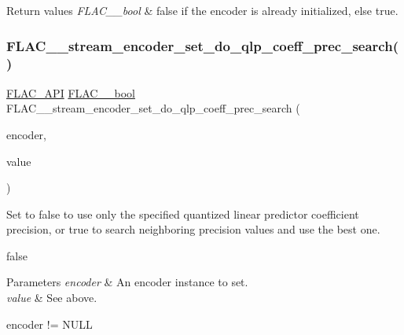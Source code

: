 \begin{DoxyRetVals}{Return values}
{\em F\+L\+A\+C\+\_\+\+\_\+bool} & {\ttfamily false} if the encoder is already initialized, else {\ttfamily true}. \\
\hline
\end{DoxyRetVals}
\mbox{\label{group__flac__stream__encoder_ga3aa94a1aec1cf40c37e54434c86bb50d}} 
\subsubsection{\texorpdfstring{F\+L\+A\+C\+\_\+\+\_\+stream\+\_\+encoder\+\_\+set\+\_\+do\+\_\+qlp\+\_\+coeff\+\_\+prec\+\_\+search()}{FLAC\_\_stream\_encoder\_set\_do\_qlp\_coeff\_prec\_search()}}
{\footnotesize\ttfamily \hyperlink{group__flac__export_ga56ca07df8a23310707732b1c0007d6f5}{F\+L\+A\+C\+\_\+\+A\+PI} \hyperlink{ordinals_8h_a95103469f1cbd78b8cf250194985b34e}{F\+L\+A\+C\+\_\+\+\_\+bool} F\+L\+A\+C\+\_\+\+\_\+stream\+\_\+encoder\+\_\+set\+\_\+do\+\_\+qlp\+\_\+coeff\+\_\+prec\+\_\+search (\begin{DoxyParamCaption}\item[{\hyperlink{struct_f_l_a_c_____stream_encoder}{F\+L\+A\+C\+\_\+\+\_\+\+Stream\+Encoder} $\ast$}]{encoder,  }\item[{\hyperlink{ordinals_8h_a95103469f1cbd78b8cf250194985b34e}{F\+L\+A\+C\+\_\+\+\_\+bool}}]{value }\end{DoxyParamCaption})}

Set to {\ttfamily false} to use only the specified quantized linear predictor coefficient precision, or {\ttfamily true} to search neighboring precision values and use the best one.

{\ttfamily false} 
\begin{DoxyParams}{Parameters}
{\em encoder} & An encoder instance to set. \\
\hline
{\em value} & See above.  
\begin{DoxyCode}
encoder != NULL 
\end{DoxyCode}
 \\
\hline
\end{DoxyParams}

